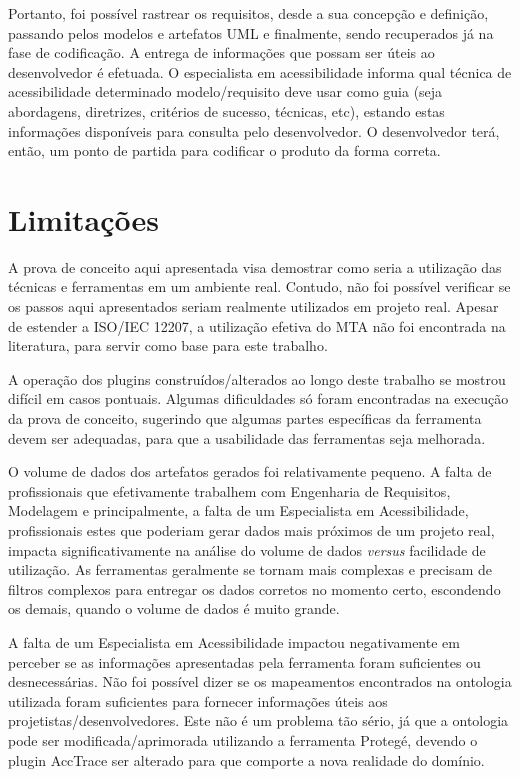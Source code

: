 \documentclass[runningheads,a4paper]{llncs}
\begin{document}
Portanto, foi possível rastrear os requisitos, desde a sua concepção e definição, passando
pelos modelos e artefatos UML e finalmente, sendo recuperados já na fase de
codificação. A entrega de informações que possam ser úteis ao desenvolvedor é efetuada.
O especialista em acessibilidade informa qual técnica de acessibilidade determinado
modelo/requisito deve usar como guia (seja abordagens, diretrizes, critérios de sucesso,
técnicas, etc), estando estas informações disponíveis para consulta pelo desenvolvedor. O
desenvolvedor terá, então, um ponto de partida para codificar o produto da forma correta.

\section{Limitações}

A prova de conceito aqui apresentada visa demostrar como seria a utilização das
técnicas e ferramentas em um ambiente real. Contudo, não foi possível verificar
se os passos aqui apresentados seriam realmente utilizados em projeto real. Apesar de estender a
ISO/IEC 12207, a utilização efetiva do MTA não foi encontrada na
literatura, para servir como base para este trabalho.

A operação dos plugins construídos/alterados ao longo deste trabalho se
mostrou difícil em casos pontuais. Algumas dificuldades só foram
encontradas na execução da prova de conceito, sugerindo que algumas partes
específicas da ferramenta devem ser adequadas, para que a usabilidade das
ferramentas seja melhorada.

O volume de dados dos artefatos gerados foi relativamente pequeno. A falta de
profissionais que efetivamente trabalhem com Engenharia de Requisitos, Modelagem
e principalmente, a falta de um Especialista em Acessibilidade, profissionais
estes que poderiam gerar dados mais próximos de um projeto real, impacta
significativamente na análise do volume de dados \textit{versus} facilidade de
utilização. As ferramentas geralmente se tornam mais complexas e precisam de
filtros complexos para entregar os dados corretos no momento certo, escondendo
os demais, quando o volume de dados é muito grande.

A falta de um Especialista em Acessibilidade impactou negativamente em perceber
se as informações apresentadas pela ferramenta foram suficientes ou
desnecessárias. Não foi possível dizer se os mapeamentos encontrados na
ontologia utilizada foram suficientes para fornecer informações úteis aos
projetistas/desenvolvedores. Este não é um problema tão sério, já que a
ontologia pode ser modificada/aprimorada utilizando a ferramenta
Protegé, devendo o plugin AccTrace ser alterado para que
comporte a nova realidade do domínio.
\end{document}
